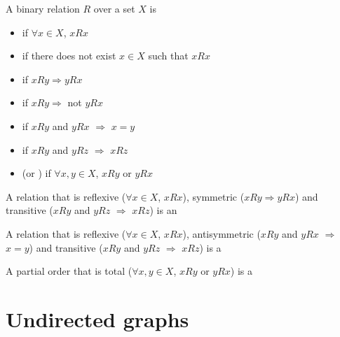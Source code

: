 \documentclass[aspectratio=43]{beamer}
\begin{document}
\begin{frame}
	\begin{definition}
		A binary relation $R$ over a set $X$ is
	\begin{itemize}
	\item {} if $\forall x\in X$, $xRx$
	\item {} if there does not exist $x\in X$ such that $xRx$
	\item {} if $xRy \Rightarrow yRx$
	\item {} if $xRy \Rightarrow $ not $y R x$
	\item {} if $xRy$ and $yRx$ $\Rightarrow$ $x=y$
	\item {} if $xRy$ and $yRz$ $\Rightarrow$  $xRz$
	\item {} (or ) if $\forall x, y\in X$, $x R y$ or $y R x$
	\end{itemize}
	\end{definition}
\end{frame}
	
	
\begin{frame} 
	\begin{definition}
	 A relation that is reflexive ($\forall x\in X$, $xRx$), symmetric ($xRy \Rightarrow yRx$) and transitive ($xRy$ and $yRz$ $\Rightarrow$  $xRz$) is an 
	\end{definition}
	\vfill
	\begin{definition}
	 A relation that is reflexive ($\forall x\in X$, $xRx$), antisymmetric ($xRy$ and $yRx$ $\Rightarrow$ $x=y$) and transitive ($xRy$ and $yRz$ $\Rightarrow$  $xRz$) is a 
	\end{definition}
	\vfill
	\begin{definition}
	A partial order that is total ($\forall x, y\in X$, $x R y$ or $y R x$) is a 
	\end{definition}
\end{frame}
	



\section{Undirected graphs}
\end{document}
